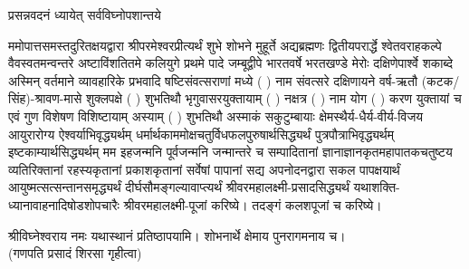 
\setlength{\parindent}{0pt}


 

{प्रसन्नवदनं ध्यायेत् सर्वविघ्नोपशान्तये}
 

ममोपात्तसमस्तदुरितक्षयद्वारा श्रीपरमेश्वरप्रीत्यर्थं शुभे शोभने मुहूर्ते अद्यब्रह्मणः
द्वितीयपरार्द्धे श्वेतवराहकल्पे वैवस्वतमन्वन्तरे अष्टाविंशतितमे कलियुगे प्रथमे पादे
जम्बूद्वीपे भारतवर्षे भरतखण्डे मेरोः दक्षिणेपार्श्वे शकाब्दे अस्मिन् वर्तमाने व्यावहारिके
 प्रभवादि षष्टिसंवत्सराणां मध्ये (  ) नाम संवत्सरे दक्षिणायने 
वर्ष-ऋतौ (कटक/सिंह)-श्रावण-मासे शुक्लपक्षे ( ) शुभतिथौ भृगुवासरयुक्तायाम्
(  ) नक्षत्र (  ) नाम  योग  ( ) करण युक्तायां च एवं गुण विशेषण विशिष्टायाम्
अस्याम् ( ) शुभतिथौ 
अस्माकं सकुटुम्बायाः क्षेमस्थैर्य-धैर्य-वीर्य-विजय आयुरारोग्य ऐश्वर्याभिवृद्ध्यर्थम्
 धर्मार्थकाममोक्ष\-चतुर्विधफलपुरुषार्थसिद्ध्यर्थं पुत्रपौत्राभि\-वृद्ध्यर्थम् इष्टकाम्यार्थसिद्ध्यर्थम्
मम इहजन्मनि पूर्वजन्मनि जन्मान्तरे च सम्पादितानां ज्ञानाज्ञानकृतमहा\-पातकचतुष्टय
व्यतिरिक्तानां रहस्यकृतानां प्रकाशकृतानां सर्वेषां पापानां सद्य अपनोदनद्वारा सकल 
पापक्षयार्थं आयुष्मत्सत्सन्तानसमृद्ध्यर्थं दीर्घसौमङ्गल्यावाप्त्यर्थं
श्रीवरमहालक्ष्मी-प्रसादसिद्ध्यर्थं 
यथाशक्ति-ध्यानावाहनादिषोडशोपचारैः 
श्रीवरमहालक्ष्मी-पूजां करिष्ये। तदङ्गं कलशपूजां च करिष्ये। 


श्रीविघ्नेश्वराय नमः यथास्थानं प्रतिष्ठापयामि। शोभनार्थे क्षेमाय पुनरागमनाय च।\\
(गणपति प्रसादं शिरसा गृहीत्वा)













